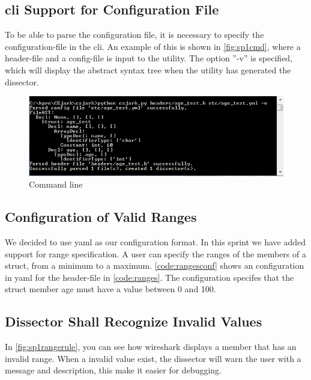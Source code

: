 \subsection{\gls{cli} Support for Configuration File}
To be able to parse the configuration file, it is necessary to specify the 
configuration-file in the \gls{cli}. An example of this is shown in 
\autoref{fig:sp1cmd}, where a \gls{header}-file and a config-file is input to the 
\gls{utility}. The option ''-v'' is specified, which will display the abstract 
syntax tree when the \gls{utility} has generated the \gls{dissector}.

\begin{figure}[ht]
	\includegraphics[width=\textwidth]{./sprints/img/cmd_agetest_run}
	\caption{Command line\label{fig:sp1cmd}}
\end{figure}

\subsection{Configuration of Valid Ranges}
We decided to use \gls{yaml} as our configuration format. In this sprint we have
added support for range specification. A user can specify the ranges of the
\glspl{member} of a \gls{struct}, from a minimum to a maximum. \autoref{code:rangesconf} 
shows an configuration in \gls{yaml} for the \gls{header}-file in \autoref{code:ranges}. 
The configuration specifes that the \gls{struct} \gls{member} age must have a value 
between 0 and 100.  





\subsection{Dissector Shall Recognize Invalid Values}
In \autoref{fig:sp1rangerule}, you can see how \Gls{wireshark} displays a \gls{member} that 
has an invalid range. When a invalid value exist, the \gls{dissector} will warn the 
user with a message and description, this make it easier for debugging.

